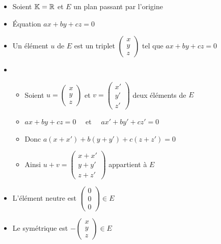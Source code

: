 \begin{frame}
\centerline{}
\pause
\hfill\hfill\begin{minipage}{0.3\textwidth}
\end{minipage}
\vspace*{-5ex} 
\begin{itemize}
  \item Soient $\mathbb{K}=\mathbb{R}$ et $E$ un plan passant par l'origine
 
\pause  
  \item \'Equation $ax + by + cz = 0$
 
\pause
  \item Un élément $u$ de $E$ est un triplet 
  $\left(\begin{smallmatrix}x\\ y\\ z\end{smallmatrix}\right)$ tel que
$ax + by + cz = 0$
\pause  
  \item 
  \begin{itemize}
     \item Soient $u=\left(\begin{smallmatrix}x\\ y\\ z\end{smallmatrix}\right)$ et 
$v=\left(\begin{smallmatrix}x'\\ y'\\ z'\end{smallmatrix}\right)$ deux éléments de $E$
\pause
     \item $a x + b y + c z  =  0$  \ \  et \ \  $a x' + b y' + c z' = 0$  
\pause     
     \item Donc $a (x + x') + b(y + y') + c (z + z') = 0$
\pause     
     \item Ainsi $u+v=\left(\begin{smallmatrix}x + x'\\ y + y'\\ z + z'\end{smallmatrix}\right)$ 
appartient à $E$
  \end{itemize}
\pause  
  \item L'élément neutre est $\left(\begin{smallmatrix}0\\ 0\\ 0\end{smallmatrix}\right) \in E$
  
\pause  
  \item Le symétrique est $-\left(\begin{smallmatrix}x\\ y\\ z\end{smallmatrix}\right) \in E$
\end{itemize}



\end{frame}


